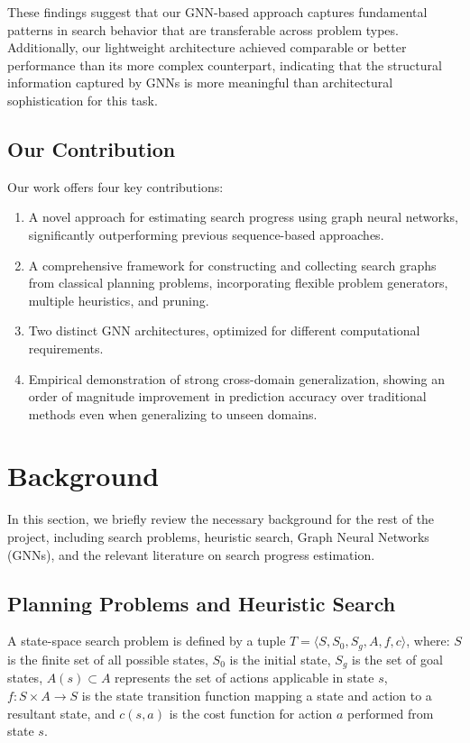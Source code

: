 \documentclass[letterpaper]{article}
\begin{document}
These findings suggest that our GNN-based approach captures fundamental patterns in search behavior that are transferable across problem types. Additionally, our lightweight architecture achieved comparable or better performance than its more complex counterpart, indicating that the structural information captured by GNNs is more meaningful than architectural sophistication for this task.

\subsection{Our Contribution}

Our work offers four key contributions:
\begin{enumerate}
    \item A novel approach for estimating search progress using graph neural networks, significantly outperforming previous sequence-based approaches.
    \item A comprehensive framework for constructing and collecting search graphs from classical planning problems, incorporating flexible problem generators, multiple heuristics, and pruning.
    \item Two distinct GNN architectures, optimized for different computational requirements.
    \item Empirical demonstration of strong cross-domain generalization, showing an order of magnitude improvement in prediction accuracy over traditional methods even when generalizing to unseen domains.
\end{enumerate}

\section{Background}

In this section, we briefly review the necessary background for the rest of the project, including search problems, heuristic search, Graph Neural Networks (GNNs), and the relevant literature on search progress estimation.

\subsection{Planning Problems and Heuristic Search}

A state-space search problem is defined by a tuple $T = \langle S, S_0, S_g, A, f, c\rangle$, where: $S$ is the finite set of all possible states, $S_0$ is the initial state, $S_g$ is the set of goal states, $A(s) \subset A$ represents the set of actions applicable in state $s$, $f: S \times A \rightarrow S$ is the state transition function mapping a state and action to a resultant state, and $c(s,a)$ is the cost function for action $a$ performed from state $s$.
\end{document}
